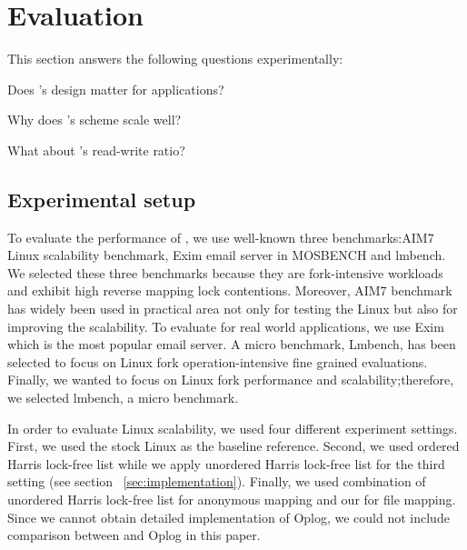 \section{Evaluation}


This section answers the following questions experimentally:
\begin{CompactItemize}
\item Does \ldu's design matter for applications?

\item Why does \ldu's scheme scale well?

\item What about \ldu's read-write ratio?
\end{CompactItemize}

\subsection{Experimental setup}



To evaluate the performance of , we use well-known
three benchmarks:AIM7 Linux scalability benchmark, Exim email server in
MOSBENCH and lmbench.
We selected these three benchmarks because they are fork-intensive workloads and
exhibit high reverse mapping lock contentions.
Moreover, AIM7 benchmark has widely been used in practical area not only for testing the
Linux but also for improving the scalability. 
To evaluate  for real world
applications, we use Exim which is the most popular email server.
A micro benchmark, Lmbench, has been selected to focus on Linux fork operation-intensive
fine grained evaluations.
Finally, we wanted to focus on Linux fork performance and scalability;therefore,
we selected lmbench, a micro benchmark.


In order to evaluate Linux scalability, we used four different experiment
settings.
First, we used the stock Linux as the baseline reference. 
Second, we used ordered Harris lock-free list while 
we apply unordered Harris lock-free list for the third setting
(see section ~\ref{sec:implementation}). 
Finally, we used combination of unordered Harris lock-free list for anonymous mapping and
our  for file mapping.
Since we cannot obtain detailed implementation of Oplog, 
we could not include comparison between  and Oplog in this paper.

